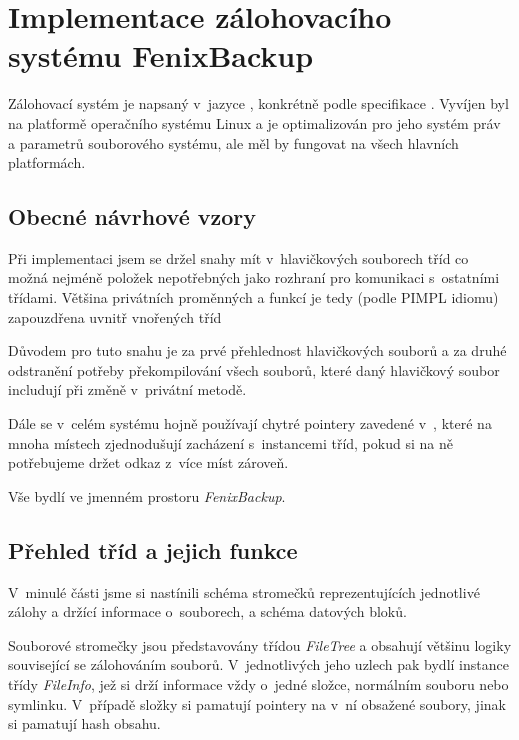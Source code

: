 \chapter{Implementace zálohovacího systému FenixBackup}

Zálohovací systém je napsaný v~jazyce \Cpp, konkrétně podle specifikace
. Vyvíjen byl na platformě operačního systému Linux a je optimalizován
pro jeho systém práv a parametrů souborového systému, ale měl by fungovat na
všech hlavních platformách.

\section{Obecné návrhové vzory}


Při implementaci jsem se držel snahy mít v~hlavičkových souborech tříd co možná
nejméně položek nepotřebných jako rozhraní pro komunikaci s~ostatními třídami.
Většina privátních proměnných a funkcí je tedy (podle \gls{PIMPL} idiomu)
zapouzdřena uvnitř vnořených tříd

Důvodem pro tuto snahu je za prvé přehlednost hlavičkových souborů a za druhé
odstranění potřeby překompilování všech souborů, které daný hlavičkový soubor
includují při změně v~privátní metodě.

Dále se v~celém systému hojně používají chytré pointery zavedené v~,
které na mnoha místech zjednodušují zacházení s~instancemi tříd, pokud si na ně
potřebujeme držet odkaz z~více míst zároveň.

Vše bydlí ve jmenném prostoru {\it FenixBackup}.

\section{Přehled tříd a jejich funkce}

V~minulé části jsme si nastínili schéma stromečků reprezentujících jednotlivé
zálohy a držící informace o~souborech, a schéma datových bloků.

Souborové stromečky jsou představovány třídou {\it FileTree} a obsahují většinu
logiky související se zálohováním souborů. V~jednotlivých jeho uzlech pak bydlí
instance třídy {\it FileInfo}, jež si drží informace vždy o~jedné složce,
normálním souboru nebo symlinku. V~případě složky si pamatují pointery na v~ní
obsažené soubory, jinak si pamatují hash obsahu.

